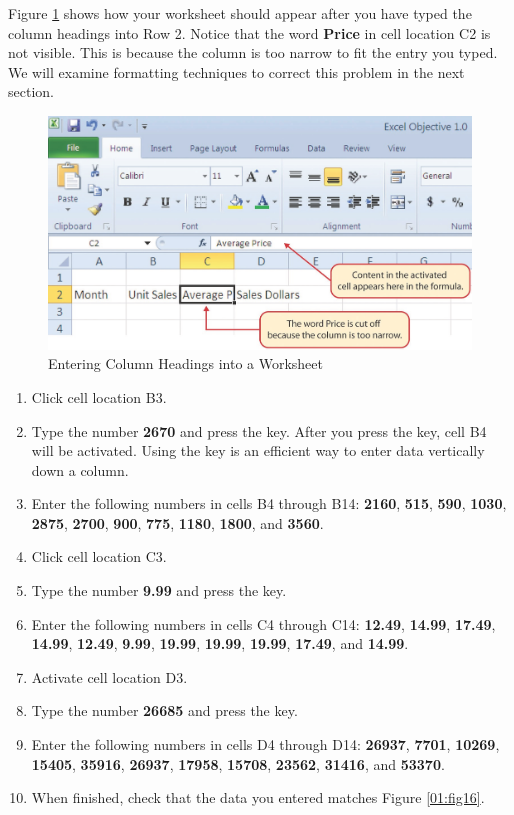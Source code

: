 Figure \ref{01:fig15} shows how your worksheet should appear after you have typed the column headings into Row 2. Notice that the word \textbf{Price} in cell location \textsf{C2} is not visible. This is because the column is too narrow to fit the entry you typed. We will examine formatting techniques to correct this problem in the next section.

\begin{figure}[H]
	\centering
	\includegraphics[width=\maxwidth{.95\linewidth}]{gfx/ch01_fig15}
	\caption{Entering Column Headings into a Worksheet}
	\label{01:fig15}
\end{figure}

\begin{enumerate}
	\item Click cell location \textsf{B3}.
	\item Type the number \textbf{2670} and press the  key. After you press the  key, cell \textsf{B4} will be activated. Using the  key is an efficient way to enter data vertically down a column.
	\item Enter the following numbers in cells \textsf{B4} through \textsf{B14}: \textbf{2160}, \textbf{515}, \textbf{590}, \textbf{1030}, \textbf{2875}, \textbf{2700}, \textbf{900}, \textbf{775}, \textbf{1180}, \textbf{1800}, and \textbf{3560}.
	\item Click cell location \textsf{C3}.
	\item Type the number \textbf{9.99} and press the  key.
	\item Enter the following numbers in cells \textsf{C4} through \textsf{C14}: \textbf{12.49}, \textbf{14.99}, \textbf{17.49}, \textbf{14.99}, \textbf{12.49}, \textbf{9.99}, \textbf{19.99}, \textbf{19.99}, \textbf{19.99}, \textbf{17.49}, and \textbf{14.99}.
	\item Activate cell location \textsf{D3}.
	\item Type the number \textbf{26685} and press the  key.
	\item Enter the following numbers in cells \textsf{D4} through \textsf{D14}: \textbf{26937}, \textbf{7701}, \textbf{10269}, \textbf{15405}, \textbf{35916}, \textbf{26937}, \textbf{17958}, \textbf{15708}, \textbf{23562}, \textbf{31416}, and \textbf{53370}.
	\item When finished, check that the data you entered matches Figure \ref{01:fig16}.
\end{enumerate}

